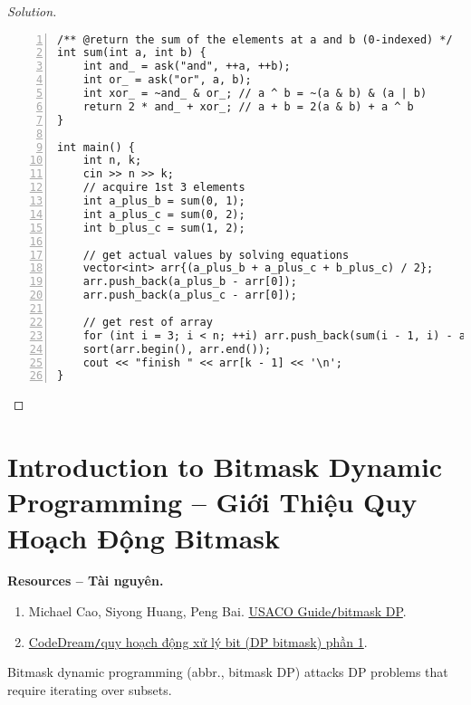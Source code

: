 \documentclass{article}
\begin{document}
\begin{proof}[Solution]
\begin{Verbatim}[numbers=left,xleftmargin=5mm]
/** @return the sum of the elements at a and b (0-indexed) */
int sum(int a, int b) {
    int and_ = ask("and", ++a, ++b);
    int or_ = ask("or", a, b);
    int xor_ = ~and_ & or_; // a ^ b = ~(a & b) & (a | b)
    return 2 * and_ + xor_; // a + b = 2(a & b) + a ^ b
}

int main() {
    int n, k;
    cin >> n >> k;
    // acquire 1st 3 elements
    int a_plus_b = sum(0, 1);
    int a_plus_c = sum(0, 2);
    int b_plus_c = sum(1, 2);

    // get actual values by solving equations
    vector<int> arr{(a_plus_b + a_plus_c + b_plus_c) / 2};
    arr.push_back(a_plus_b - arr[0]);
    arr.push_back(a_plus_c - arr[0]);

    // get rest of array
    for (int i = 3; i < n; ++i) arr.push_back(sum(i - 1, i) - arr.back());
    sort(arr.begin(), arr.end());
    cout << "finish " << arr[k - 1] << '\n';
}
    \end{Verbatim}

\end{proof}


\section{Introduction to Bitmask Dynamic Programming -- Giới Thiệu Quy Hoạch Động Bitmask}
\textbf{\textsf{Resources -- Tài nguyên.}}
\begin{enumerate}
    \item {\sc Michael Cao, Siyong Huang, Peng Bai}. \href{https://usaco.guide/gold/dp-bitmasks}{USACO Guide{\tt/}bitmask DP}.

    \item \href{https://codedream.edu.vn/bitmask_1/}{CodeDream{\tt/}quy hoạch động xử lý bit (DP bitmask) phần 1}.
\end{enumerate}
Bitmask dynamic programming (abbr., bitmask DP) attacks DP problems that require iterating over subsets.
\end{document}
